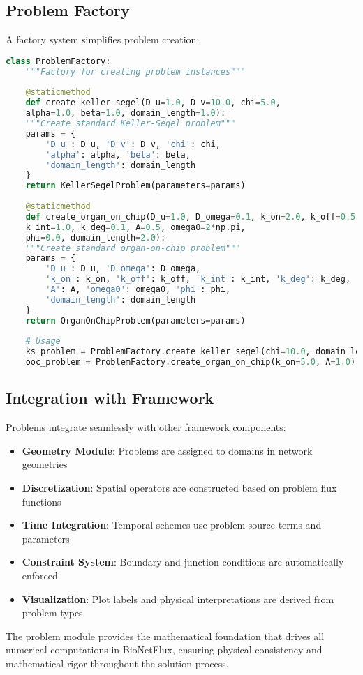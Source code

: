 \subsection{Problem Factory}
\label{subsec:problem_factory}

A factory system simplifies problem creation:

\begin{lstlisting}[language=Python, caption=Problem Factory]
	class ProblemFactory:
	"""Factory for creating problem instances"""
	
	@staticmethod
	def create_keller_segel(D_u=1.0, D_v=10.0, chi=5.0, 
	alpha=1.0, beta=1.0, domain_length=1.0):
	"""Create standard Keller-Segel problem"""
	params = {
		'D_u': D_u, 'D_v': D_v, 'chi': chi,
		'alpha': alpha, 'beta': beta,
		'domain_length': domain_length
	}
	return KellerSegelProblem(parameters=params)
	
	@staticmethod  
	def create_organ_on_chip(D_u=1.0, D_omega=0.1, k_on=2.0, k_off=0.5,
	k_int=1.0, k_deg=0.1, A=0.5, omega0=2*np.pi,
	phi=0.0, domain_length=2.0):
	"""Create standard organ-on-chip problem"""
	params = {
		'D_u': D_u, 'D_omega': D_omega,
		'k_on': k_on, 'k_off': k_off, 'k_int': k_int, 'k_deg': k_deg,
		'A': A, 'omega0': omega0, 'phi': phi,
		'domain_length': domain_length
	}
	return OrganOnChipProblem(parameters=params)
	
	# Usage
	ks_problem = ProblemFactory.create_keller_segel(chi=10.0, domain_length=2.0)
	ooc_problem = ProblemFactory.create_organ_on_chip(k_on=5.0, A=1.0)
\end{lstlisting}

\subsection{Integration with Framework}
\label{subsec:problem_integration}

Problems integrate seamlessly with other framework components:

\begin{itemize}
	\item \textbf{Geometry Module}: Problems are assigned to domains in network geometries
	\item \textbf{Discretization}: Spatial operators are constructed based on problem flux functions
	\item \textbf{Time Integration}: Temporal schemes use problem source terms and parameters
	\item \textbf{Constraint System}: Boundary and junction conditions are automatically enforced
	\item \textbf{Visualization}: Plot labels and physical interpretations are derived from problem types
\end{itemize}

The problem module provides the mathematical foundation that drives all numerical computations in BioNetFlux, ensuring physical consistency and mathematical rigor throughout the solution process.